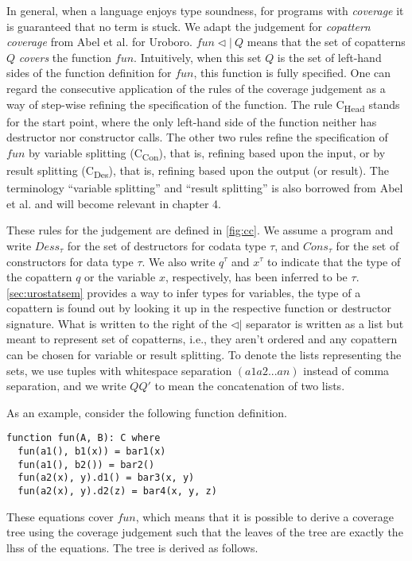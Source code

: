 In general, when a language enjoys type soundness, for programs with \textit{coverage} it is guaranteed that no term is stuck. We adapt the judgement for \textit{copattern coverage} from Abel et al.\cite{abel13copatterns} for Uroboro. $fun \lhd | ~ Q$ means that the set of copatterns $Q$ \textit{covers} the function $fun$. Intuitively, when this set $Q$ is the set of left-hand sides of the function definition for $fun$, this function is fully specified. One can regard the consecutive application of the rules of the coverage judgement as a way of step-wise refining the specification of the function. The rule C\textsubscript{Head} stands for the start point, where the only left-hand side of the function neither has destructor nor constructor calls. The other two rules refine the specification of $fun$ by variable splitting (C\textsubscript{Con}), that is, refining based upon the input, or by result splitting (C\textsubscript{Des}), that is, refining based upon the output (or result). The terminology ``variable splitting'' and ``result splitting'' is also borrowed from Abel et al. and will become relevant in chapter 4.

These rules for the judgement are defined in \autoref{fig:cc}. We assume a program and write $Dess_\tau$ for the set of destructors for codata type $\tau$, and $Cons_\tau$ for the set of constructors for data type $\tau$. We also write $q^\tau$ and $x^\tau$ to indicate that the type of the copattern $q$ or the variable $x$, respectively, has been inferred to be $\tau$. \autoref{sec:urostatsem} provides a way to infer types for variables, the type of a copattern is found out by looking it up in the respective function or destructor signature. What is written to the right of the $\lhd |$ separator is written as a list but meant to represent set of copatterns, i.e., they aren't ordered and any copattern can be chosen for variable or result splitting. To denote the lists representing the sets, we use tuples with whitespace separation $(a1 a2 ... an)$ instead of comma separation, and we write $Q Q'$ to mean the concatenation of two lists.

As an example, consider the following function definition.
\begin{lstlisting}
function fun(A, B): C where
  fun(a1(), b1(x)) = bar1(x)
  fun(a1(), b2()) = bar2()
  fun(a2(x), y).d1() = bar3(x, y)
  fun(a2(x), y).d2(z) = bar4(x, y, z)
\end{lstlisting}
These equations cover $fun$, which means that it is possible to derive a coverage tree using the coverage judgement such that the leaves of the tree are exactly the lhss of the equations. The tree is derived as follows.

